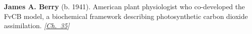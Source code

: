\textbf{James A. Berry} (b. 1941). American plant physiologist who co-developed the FvCB model, a biochemical framework describing photosynthetic carbon dioxide assimilation. \emph{[\hyperref[ch:treesfromair]{Ch.~35}]}

